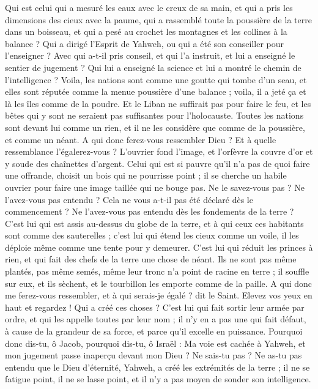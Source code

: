 \begin{multicols}{2}
Qui est celui qui a mesuré les eaux avec le creux de sa main, et qui a pris les dimensions des cieux avec la paume, qui a rassemblé toute la poussière de la terre dans un boisseau, et qui a pesé au crochet les montagnes et les collines à la balance ?
Qui a dirigé l'Esprit de Yahweh, ou qui a été son conseiller pour l'enseigner ?
Avec qui a-t-il pris conseil, et qui l'a instruit, et lui a enseigné le sentier de jugement ? Qui lui a enseigné la science et lui a montré le chemin de l'intelligence ?
Voila, les nations sont comme une goutte qui tombe d'un seau, et elles sont réputée comme la menue poussière d'une balance ; voila, il a jeté ça et là les îles comme de la poudre.
Et le Liban ne suffirait pas pour faire le feu, et les bêtes qui y sont ne seraient pas suffisantes pour l'holocauste.
Toutes les nations sont devant lui comme un rien, et il ne les considère que comme de la poussière, et comme un néant.
A qui donc ferez-vous ressembler Dieu ? Et à quelle ressemblance l'égalerez-vous ?
L'ouvrier fond l'image, et l'orfèvre la couvre d'or et y soude des chaînettes d'argent.
Celui qui est si pauvre qu'il n'a pas de quoi faire une offrande, choisit un bois qui ne pourrisse point ; il se cherche un habile ouvrier pour faire une image taillée qui ne bouge pas.
Ne le savez-vous pas ? Ne l'avez-vous pas entendu ? Cela ne vous a-t-il pas été déclaré dès le commencement ? Ne l'avez-vous pas entendu dès les fondements de la terre ?
C'est lui qui est assis au-dessus du globe de la terre, et à qui ceux ces habitants sont comme des sauterelles ; c'est lui qui étend les cieux comme un voile, il les déploie même comme une tente pour y demeurer.
C'est lui qui réduit les princes à rien, et qui fait des chefs de la terre une chose de néant.
Ils ne sont pas même plantés, pas même semés, même leur tronc n'a point de racine en terre ; il souffle sur eux, et ils sèchent, et le tourbillon les emporte comme de la paille.
A qui donc me ferez-vous ressembler, et à qui serais-je égalé ? dit le Saint.
Elevez vos yeux en haut et regardez ! Qui a créé ces choses ? C'est lui qui fait sortir leur armée par ordre, et qui les appelle toutes par leur nom ; il n'y en a pas une qui fait défaut, à cause de la grandeur de sa force, et parce qu'il excelle en puissance.
Pourquoi donc dis-tu, ô Jacob, pourquoi dis-tu, ô Israël : Ma voie est cachée à Yahweh, et mon jugement passe inaperçu devant mon Dieu ?
Ne sais-tu pas ? Ne as-tu pas entendu que le Dieu d'éternité, Yahweh, a créé les extrémités de la terre ; il ne se fatigue point, il ne se lasse point, et il n'y a pas moyen de sonder son intelligence.

\end{multicols}
